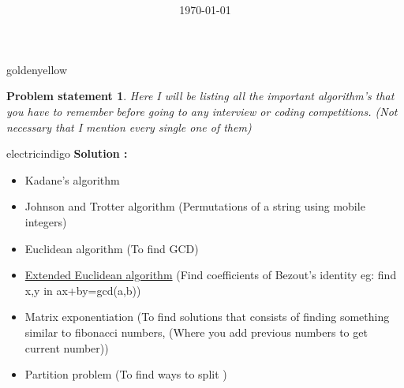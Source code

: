 \documentclass[12pt]{article}
\newtheorem*{prob*}{Problem statement}
\begin{document}
	\title{
		\fontsize{16}{24}\bfseries
	}
	\date{\today}
	\maketitle



	
	\begin{mybox}{goldenyellow}{}
		\begin{prob*}		
			Here I will be listing all the important algorithm's that you have to remember before going to any interview or coding competitions. (Not necessary that I mention every single one of them)
			\end{prob*}
	\end{mybox}


\vspace{0.3cm}				
			
\begin{mybox}{electricindigo}{}
	\textbf{Solution :} 
	\begin{itemize}
		\item[\textbf{1}] Kadane's algorithm 
		\item[\textbf{2}] Johnson and Trotter algorithm (Permutations of a string using mobile integers) 
		\item[\textbf{3}] Euclidean algorithm (To find GCD) 
		\item[\textbf{4}] \href{https://en.wikipedia.org/wiki/Extended_Euclidean_algorithm}{Extended Euclidean algorithm} (Find coefficients of Bezout's identity eg: find x,y in ax+by=gcd(a,b))
		\item[\textbf{5}] Matrix exponentiation (To find solutions that consists of finding something similar to fibonacci numbers, (Where you add previous numbers to get current number))
		\item[\textbf{5}] Partition problem (To find ways to split )
		
	\end{itemize}
	

\end{mybox}


	

		
		
\end{document}

